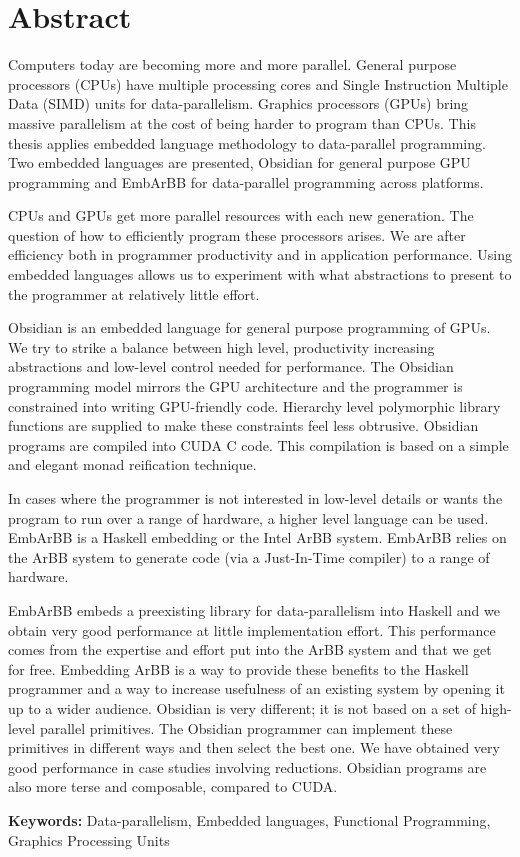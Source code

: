 \thispagestyle{empty}

\section*{Abstract}

\vspace{5mm}

\begin{small}
Computers today are becoming more and more parallel. General purpose processors (CPUs) 
have multiple processing cores and Single Instruction Multiple Data (SIMD) units for 
data-parallelism. Graphics processors (GPUs) bring massive parallelism at the cost of 
being harder to program than CPUs. This thesis applies embedded language methodology 
to data-parallel programming. Two embedded languages are presented, Obsidian for general 
purpose GPU programming and EmbArBB for data-parallel programming across platforms. 

CPUs and GPUs get more parallel resources with each new generation. The question of how to 
efficiently program these processors arises. We are after efficiency both in programmer 
productivity and in application performance. Using embedded languages allows us to experiment
with what abstractions to present to the programmer at relatively little effort.

Obsidian is an embedded language for general purpose programming of GPUs. We try to strike 
a balance between high level, productivity increasing abstractions and low-level 
control needed for performance. The Obsidian programming model mirrors the GPU architecture 
and the programmer is constrained into writing GPU-friendly code. Hierarchy level 
polymorphic library functions are supplied to make these constraints feel less obtrusive. 
Obsidian programs are compiled into CUDA C code. This compilation is based on a simple 
and elegant monad reification technique.  

In cases where the programmer is not interested in low-level details 
or wants the program to run over a range of hardware, a higher level language can be used.
EmbArBB is a Haskell embedding or the Intel ArBB system. EmbArBB relies on the ArBB system 
to generate code (via a Just-In-Time compiler) to a range of hardware. 

EmbArBB embeds a preexisting library for data-parallelism into Haskell and we obtain 
very good performance at little implementation effort. This performance comes from the 
expertise and effort put into the ArBB system and that we get for free. Embedding ArBB is 
a way to provide these benefits to the Haskell programmer and a way to increase usefulness
of an existing system by opening it up to a wider audience. Obsidian is very different; it 
is not based on a set of high-level parallel primitives. The Obsidian programmer 
can implement these primitives in different ways and then select the best one. 
We have obtained very good performance in case studies involving reductions. Obsidian 
programs are also more terse and composable, compared to CUDA. 
 
\vspace{5mm}

\noindent

\textbf{Keywords:} Data-parallelism, Embedded languages, Functional Programming, Graphics Processing Units


\end{small}
\newpage
